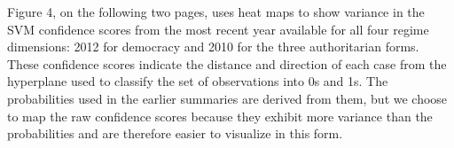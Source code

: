 \documentclass[pdftex,12pt,fullpage,oneside]{amsart}
\begin{document}

Figure 4, on the following two pages, uses heat maps to show variance in the SVM confidence scores from the most recent year available for all four regime dimensions: 2012 for democracy and 2010 for the three authoritarian forms. These confidence scores indicate the distance and direction of each case from the hyperplane used to classify the set of observations into 0s and 1s. The probabilities used in the earlier summaries are derived from them, but we choose to map the raw confidence scores because they exhibit more variance than the probabilities and are therefore easier to visualize in this form.
\end{document}

